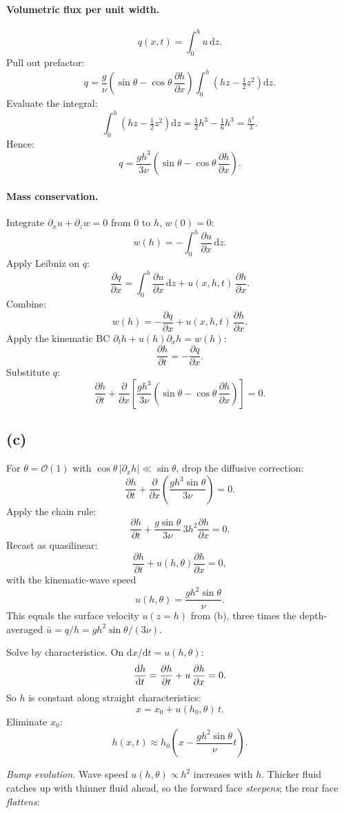 \documentclass[11pt]{article}
\newcommand{\de}{\mathrm{d}}
\newcommand{\pd}[2]{\frac{\partial #1}{\partial #2}}
\begin{document}
\paragraph{Volumetric flux per unit width.}
\[ q(x,t) = \int_{0}^{h}\!u\,\de z. \]
Pull out prefactor:
\[ q = \frac{g}{\nu}\!\left(\sin\theta - \cos\theta\,\pd{h}{x}\right)\!\int_{0}^{h}\!\left(hz - \tfrac12 z^{2}\right)\de z. \]
Evaluate the integral:
\[ \int_{0}^{h}\!\left(hz - \tfrac12 z^{2}\right)\de z = \tfrac12 h^{3} - \tfrac16 h^{3} = \tfrac{h^{3}}{3}. \]
Hence:
\[ q = \frac{gh^{3}}{3\nu}\!\left(\sin\theta - \cos\theta\,\pd{h}{x}\right). \]

\paragraph{Mass conservation.} Integrate $\partial_{x}u + \partial_{z}w = 0$ from $0$ to $h$, $w(0)=0$:
\[ w(h) = -\!\int_{0}^{h}\!\pd{u}{x}\,\de z. \]
Apply Leibniz on $q$:
\[ \pd{q}{x} = \int_{0}^{h}\!\pd{u}{x}\,\de z + u(x,h,t)\,\pd{h}{x}. \]
Combine:
\[ w(h) = -\pd{q}{x} + u(x,h,t)\,\pd{h}{x}. \]
Apply the kinematic BC $\partial_{t}h + u(h)\partial_{x}h = w(h)$:
\[ \pd{h}{t} = -\pd{q}{x}. \]
Substitute $q$:
\[ \boxed{\;\pd{h}{t} + \pd{}{x}\!\left[\frac{gh^{3}}{3\nu}\!\left(\sin\theta - \cos\theta\,\pd{h}{x}\right)\right] = 0.\;} \]

\subsection*{(c)}

For $\theta=\mathcal O(1)$ with $\cos\theta\,|\partial_{x}h|\ll\sin\theta$, drop the diffusive correction:
\[ \pd{h}{t} + \pd{}{x}\!\left(\frac{gh^{3}\sin\theta}{3\nu}\right) = 0. \]
Apply the chain rule:
\[ \pd{h}{t} + \frac{g\sin\theta}{3\nu}\,3h^{2}\pd{h}{x} = 0. \]
Recast as quasilinear:
\[ \pd{h}{t} + u(h,\theta)\pd{h}{x} = 0, \]
with the kinematic-wave speed
\[ \boxed{\;u(h,\theta) = \frac{gh^{2}\sin\theta}{\nu}.\;} \]
This equals the surface velocity $u(z=h)$ from (b), three times the depth-averaged $\bar u = q/h = gh^{2}\sin\theta/(3\nu)$.

Solve by characteristics. On $\de x/\de t = u(h,\theta)$:
\[ \dv{h}{t} = \pd{h}{t} + u\,\pd{h}{x} = 0. \]
So $h$ is constant along straight characteristics:
\[ x = x_{0} + u(h_{0},\theta)\,t. \]
Eliminate $x_{0}$:
\[ \boxed{\;h(x,t) \approx h_{0}\!\left(x - \frac{gh^{2}\sin\theta}{\nu}t\right).\;} \]

\medskip
\noindent\emph{Bump evolution.} Wave speed $u(h,\theta) \propto h^{2}$ increases with $h$. Thicker fluid catches up with thinner fluid ahead, so the forward face \emph{steepens}; the rear face \emph{flattens}:
\end{document}
